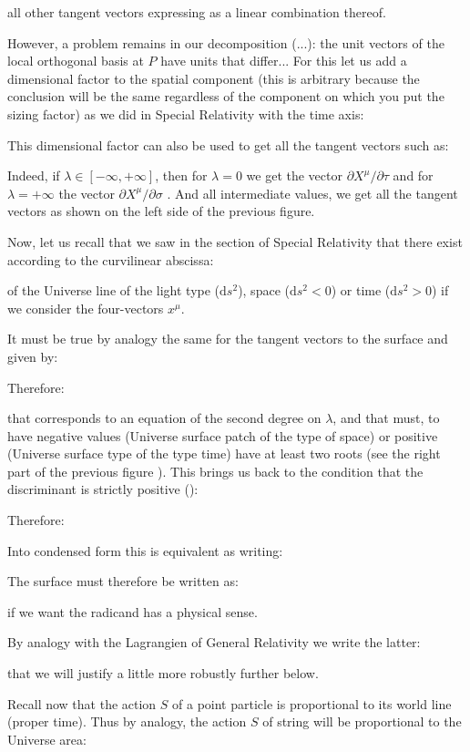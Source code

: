 	all other tangent vectors expressing as a linear combination thereof.
	
	However, a problem remains in our decomposition (...): the unit vectors of the local orthogonal basis at $P$ have units that differ... For this let us add a dimensional factor  to the spatial component (this is arbitrary because the conclusion will be the same regardless of the component on which you put the sizing factor) as we did in Special Relativity with the time axis:
	
	This dimensional factor can also be used to get all the tangent vectors such as:
	
	Indeed, if $\lambda\in [-\infty,+\infty]$, then for $\lambda=0$ we get the vector $\partial X^\mu/\partial \tau$ and for $\lambda=+\infty$ the vector $\partial X^\mu/\partial \sigma$ . And all intermediate values, we get all the tangent vectors as shown on the left side of the previous figure.

	Now, let us recall that we saw in the section of Special Relativity that there exist according to the curvilinear abscissa:
	
	of the Universe line of the light type ($\mathrm{d}s^2$), space ($\mathrm{d}s^2<0$) or time ($\mathrm{d}s^2>0$) if we consider the four-vectors $x^\mu$.

	It must be true by analogy the same for the tangent vectors to the surface and given by:
	
	Therefore:
	
	that corresponds to an equation of the second degree on $\lambda$, and that must, to have negative values (Universe surface patch of the type of space) or positive (Universe surface type of the type time) have at least two roots (see the right part of the previous figure ). This brings us back to the condition that the discriminant is strictly positive ():
	
	Therefore:
	
	Into condensed form this is equivalent as writing:
	
	The surface must therefore be written as:
	
	if we want the radicand has a physical sense.
	
	By analogy with the Lagrangien of General Relativity we write the latter:
	
	that we will justify a little more robustly further below.
	
	Recall now that the action $S$ of a point particle is proportional to its world line (proper time). Thus by analogy, the action $S$ of string will be proportional to the Universe area:
	
